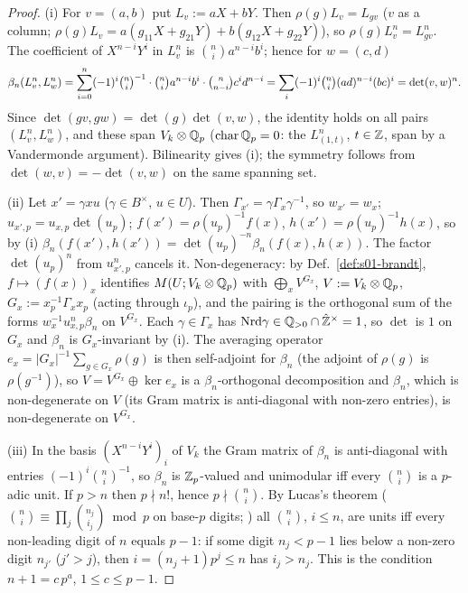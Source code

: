 \begin{proof}
(i) For $v=(a,b)$ put $L_v:=aX+bY$. Then $\rho(g)L_v=L_{gv}$ ($v$ as a column; $\rho(g)L_v=a(g_{11}X+g_{21}Y)+b(g_{12}X+g_{22}Y)$), so
$\rho(g)L_v^n=L_{gv}^n$. The coefficient of $X^{n-i}Y^i$ in $L_v^n$ is $\binom ni a^{n-i}b^i$; hence for $w=(c,d)$
\[\beta_n(L_v^n,L_w^n)=\sum_{i=0}^n(-1)^i\tbinom ni^{-1}\cdot\tbinom ni a^{n-i}b^i\cdot\tbinom n{n-i}c^{i}d^{n-i}=\sum_{i}(-1)^i\tbinom ni(ad)^{n-i}(bc)^i=\det(v,w)^n .\]
Since $\det(gv,gw)=\det(g)\det(v,w)$, the identity holds on all pairs $(L_v^n,L_w^n)$, and these span $V_k\otimes\mathbb{Q}_p$ ($\mathrm{char}\,\mathbb{Q}_p=0$:
the $L_{(1,t)}^n$, $t\in\mathbb{Z}$, span by a Vandermonde argument). Bilinearity gives (i); the symmetry follows from
$\det(w,v)=-\det(v,w)$ on the same spanning set.

(ii) Let $x'=\gamma xu$ ($\gamma\in B^\times$, $u\in U$). Then $\Gamma_{x'}=\gamma\Gamma_x\gamma^{-1}$, so $w_{x'}=w_x$; $u_{x',p}=u_{x,p}\det(u_p)$;
$f(x')=\rho(u_p)^{-1}f(x)$, $h(x')=\rho(u_p)^{-1}h(x)$, so by (i) $\beta_n(f(x'),h(x'))=\det(u_p)^{-n}\beta_n(f(x),h(x))$. The factor
$\det(u_p)^{n}$ from $u_{x',p}^n$ cancels it. Non-degeneracy: by Def.~\ref{def:s01-brandt}, $f\mapsto(f(x))_x$ identifies
$M(U;V_k\otimes\mathbb{Q}_p)$ with $\bigoplus_xV^{G_x}$, $V:=V_k\otimes\mathbb{Q}_p$, $G_x:=x_p^{-1}\Gamma_xx_p$ (acting through $\iota_p$), and the
pairing is the orthogonal sum of the forms $w_x^{-1}u_{x,p}^n\beta_n$ on $V^{G_x}$. Each $\gamma\in\Gamma_x$ has $\mathrm{Nrd}\gamma\in\mathbb{Q}_{>0}\cap\hat{\mathbb{Z}}^\times=1$,
so $\det$ is $1$ on $G_x$ and $\beta_n$ is $G_x$-invariant by (i). The averaging operator $e_x=|G_x|^{-1}\sum_{g\in G_x}\rho(g)$ is then
self-adjoint for $\beta_n$ (the adjoint of $\rho(g)$ is $\rho(g^{-1})$), so $V=V^{G_x}\oplus\ker e_x$ is a $\beta_n$-orthogonal decomposition and
$\beta_n$, which is non-degenerate on $V$ (its Gram matrix is anti-diagonal with non-zero entries), is non-degenerate on $V^{G_x}$.

(iii) In the basis $(X^{n-i}Y^i)_i$ of $V_k$ the Gram matrix of $\beta_n$ is anti-diagonal with entries $(-1)^i\binom ni^{-1}$, so
$\beta_n$ is $\mathbb{Z}_p$-valued and unimodular iff every $\binom ni$ is a $p$-adic unit. If $p>n$ then $p\nmid n!$, hence $p\nmid\binom ni$.
By Lucas's theorem ($\binom ni\equiv\prod_j\binom{n_j}{i_j}\bmod p$ on base-$p$ digits; \stknown) all $\binom ni$, $i\le n$, are units iff
every non-leading digit of $n$ equals $p-1$: if some digit $n_j<p-1$ lies below a non-zero digit $n_{j'}$ ($j'>j$), then
$i=(n_j+1)p^j\le n$ has $i_j>n_j$. This is the condition $n+1=c\,p^a$, $1\le c\le p-1$.


\end{proof}
